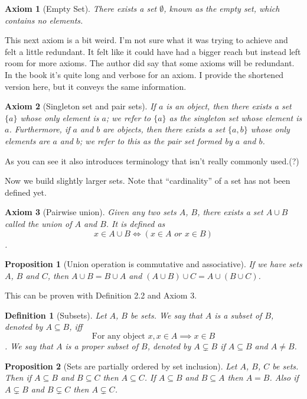 \documentclass[12pt]{article}
\newtheorem{axiom}{Axiom}
\newtheorem{proposition}{Proposition}[section]
\newtheorem{definition}{Definition}[section]
\theoremstyle{remark}
\begin{document}
\begin{axiom}[Empty Set]
    There exists a set $ \emptyset $, known as the empty set, which contains no elements. 
\end{axiom}

This next axiom is a bit weird. I'm not sure what it was trying to achieve and felt a little redundant. It felt like it could have had a bigger reach but instead left room for more axioms. The author did say that some axioms will be redundant. In the book it's quite long and verbose for an axiom. I provide the shortened version here, but it conveys the same information. 

\begin{axiom}[Singleton set and pair sets]
	If $ a $ is an object, then there exists a set $ \{a\} $ whose only element is $ a $; we refer to $ \{a\} $ as the singleton set whose element is $ a $. Furthermore, if $ a $ and $ b $ are objects, then there exists a set $ \{a,b\} $ whose only elements are $ a $ and $ b $; we refer to this as the pair set formed by $ a $ and $ b $.
\end{axiom}

As you can see it also introduces terminology that isn't really commonly used.(?) \par 

Now we build slightly larger sets. Note that ``cardinality'' of a set has not been defined yet. 

\begin{axiom}[Pairwise union]
	Given any two sets $ A $, $ B $, there exists a set $ A \cup B $ called the union of $ A $ and $ B $. It is defined as \[ x \in A \cup B \iff (x \in A \textit{ or } x \in B) \].
\end{axiom}

\begin{proposition}[Union operation is commutative and associative]
    If we have sets $ A $, $ B $ and $ C $, then $ A \cup B = B \cup A $ and $ (A \cup B) \cup C = A \cup (B \cup C) $.
\end{proposition}

This can be proven with Definition 2.2 and Axiom 3.


\begin{definition}[Subsets]
	Let $ A $, $ B $ be sets. We say that $ A $ is a \textit{subset} of $ B $, denoted by $ A \subseteq B $, iff \[ \text{For any object } x, x \in A \implies x \in B \].
	We say that $ A $ is a proper subset of $ B $, denoted by $ A \subsetneq B $ if $ A \subseteq B $ and $ A \neq B $.
\end{definition}


\begin{proposition}[Sets are partially ordered by set inclusion]
    Let $ A $, $ B $, $ C $ be sets. Then if $ A \subseteq B $ and $ B \subseteq C $ then $ A \subseteq C $. If $ A \subseteq B $ and $ B \subseteq A $ then $ A = B $. Also if $ A \subsetneq B $ and $ B \subsetneq C $ then $ A \subsetneq C $.
\end{proposition}
\end{document}
